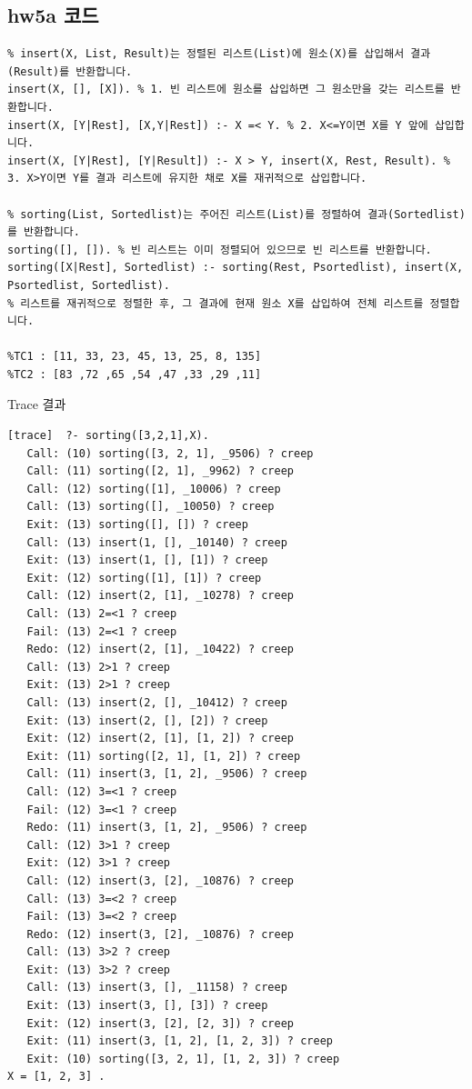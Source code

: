 \documentclass{article}
\begin{document}
\subsection{hw5a 코드}
\begin{verbatim}
% insert(X, List, Result)는 정렬된 리스트(List)에 원소(X)를 삽입해서 결과(Result)를 반환합니다.
insert(X, [], [X]). % 1. 빈 리스트에 원소를 삽입하면 그 원소만을 갖는 리스트를 반환합니다.
insert(X, [Y|Rest], [X,Y|Rest]) :- X =< Y. % 2. X<=Y이면 X를 Y 앞에 삽입합니다.
insert(X, [Y|Rest], [Y|Result]) :- X > Y, insert(X, Rest, Result). % 3. X>Y이면 Y를 결과 리스트에 유지한 채로 X를 재귀적으로 삽입합니다.

% sorting(List, Sortedlist)는 주어진 리스트(List)를 정렬하여 결과(Sortedlist)를 반환합니다.
sorting([], []). % 빈 리스트는 이미 정렬되어 있으므로 빈 리스트를 반환합니다.
sorting([X|Rest], Sortedlist) :- sorting(Rest, Psortedlist), insert(X, Psortedlist, Sortedlist). 
% 리스트를 재귀적으로 정렬한 후, 그 결과에 현재 원소 X를 삽입하여 전체 리스트를 정렬합니다.

%TC1 : [11, 33, 23, 45, 13, 25, 8, 135]
%TC2 : [83 ,72 ,65 ,54 ,47 ,33 ,29 ,11]
\end{verbatim}
Trace 결과
\begin{verbatim}
[trace]  ?- sorting([3,2,1],X).
   Call: (10) sorting([3, 2, 1], _9506) ? creep
   Call: (11) sorting([2, 1], _9962) ? creep
   Call: (12) sorting([1], _10006) ? creep
   Call: (13) sorting([], _10050) ? creep
   Exit: (13) sorting([], []) ? creep
   Call: (13) insert(1, [], _10140) ? creep
   Exit: (13) insert(1, [], [1]) ? creep
   Exit: (12) sorting([1], [1]) ? creep
   Call: (12) insert(2, [1], _10278) ? creep
   Call: (13) 2=<1 ? creep
   Fail: (13) 2=<1 ? creep
   Redo: (12) insert(2, [1], _10422) ? creep
   Call: (13) 2>1 ? creep
   Exit: (13) 2>1 ? creep
   Call: (13) insert(2, [], _10412) ? creep
   Exit: (13) insert(2, [], [2]) ? creep
   Exit: (12) insert(2, [1], [1, 2]) ? creep
   Exit: (11) sorting([2, 1], [1, 2]) ? creep
   Call: (11) insert(3, [1, 2], _9506) ? creep
   Call: (12) 3=<1 ? creep
   Fail: (12) 3=<1 ? creep
   Redo: (11) insert(3, [1, 2], _9506) ? creep
   Call: (12) 3>1 ? creep
   Exit: (12) 3>1 ? creep
   Call: (12) insert(3, [2], _10876) ? creep
   Call: (13) 3=<2 ? creep
   Fail: (13) 3=<2 ? creep
   Redo: (12) insert(3, [2], _10876) ? creep
   Call: (13) 3>2 ? creep
   Exit: (13) 3>2 ? creep
   Call: (13) insert(3, [], _11158) ? creep
   Exit: (13) insert(3, [], [3]) ? creep
   Exit: (12) insert(3, [2], [2, 3]) ? creep
   Exit: (11) insert(3, [1, 2], [1, 2, 3]) ? creep
   Exit: (10) sorting([3, 2, 1], [1, 2, 3]) ? creep
X = [1, 2, 3] .
\end{verbatim}
\end{document}
